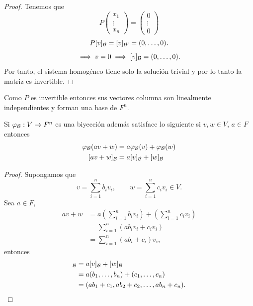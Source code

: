 \documentclass[12pt,a4paper]{book}
\newcommand{\parentesis}[1]{\left(#1\right)}
\begin{document}
    \begin{proof}
    Tenemos que
        \begin{equation*}
            P
            \begin{pmatrix}
                x_{1}\\
                \vdots\\
                x_{n}
            \end{pmatrix}
            =
            \begin{pmatrix}
                0\\
                \vdots\\
                0
            \end{pmatrix}
        \end{equation*}
        \begin{equation*}
            P[v]_{\mathcal{B}}=[v]_{\mathcal{B}^{\prime}}=(0,\dots,0).
        \end{equation*}
        \begin{equation*}
            \implies v=0\implies [v]_{\mathcal{B}}=(0,\dots,0).
        \end{equation*}
        Por tanto, el sistema homogéneo tiene solo la solución trivial y por lo tanto
        la matriz es invertible.
    \end{proof}

    Como $P$ es invertible entonces sus vectores columna son linealmente independientes y forman
    una base de $F^{n}$.
    
    \begin{proposicion}
    \label{prop:24}
        Si $\varphi_{\mathcal{B}}:V\to F^{n}$ es una biyección además satisface lo siguiente si $v,w\in V$,
        $a\in F$ entonces
        \begin{align*}
            \varphi_{\mathcal{B}}(av+w)&=a\varphi_{\mathcal{B}}(v)+\varphi_{\mathcal{B}}(w)\\
            [av+w]_{\mathcal{B}}&=a[v]_{\mathcal{B}}+[w]_{\mathcal{B}}
        \end{align*}
    \end{proposicion}

    \begin{proof}
        Supongamos que
        \begin{equation*}
            v=\sum_{i=1}^{n}b_{i}v_{i},\qquad w=\sum_{i=1}^{n}c_{i}v_{i}\in V.
        \end{equation*}
        Sea $a\in F$,
        \begin{align*}
            av+w&=a\parentesis{\sum_{i=1}^{n}b_{i}v_{i}}+\parentesis{\sum_{i=1}^{n}c_{i}v_{i}}\\
            &=\sum_{i=1}^{n}(ab_{i}v_{i}+c_{i}v_{i})\\
            &=\sum_{i=1}^{n}(ab_{i}+c_{i})v_{i},
        \end{align*}
        entonces
        \begin{align*}
            [av+w]_{\BB}&=a[v]_{\BB}+[w]_{\BB}\\
            &=a(b_{1},\dots,b_{n})+(c_{1},\dots,c_{n})\\
            &=(ab_{1}+c_{1},ab_{2}+c_{2},\dots,ab_{n}+c_{n}).
        \end{align*}
    \end{proof}
\end{document}
